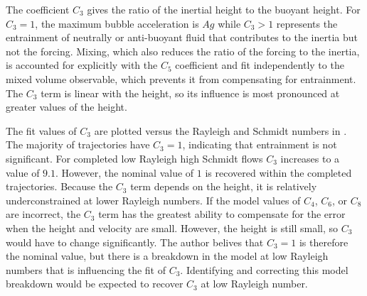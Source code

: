 The coefficient $C_3$ gives the ratio of the inertial height to the buoyant height.
For $C_3 = 1$, the maximum bubble acceleration is $A g$ while $C_3 > 1$ represents the entrainment of neutrally or anti-buoyant fluid that contributes to the inertia but not the forcing.
Mixing, which also reduces the ratio of the forcing to the inertia, is accounted for explicitly with the $C_5$ coefficient and fit independently to the mixed volume observable, which prevents it from compensating for entrainment.
The $C_3$ term is linear with the height, so its influence is most pronounced at greater values of the height.

The fit values of $C_3$ are plotted versus the Rayleigh and Schmidt numbers in .
The majority of trajectories have $C_3 = 1$, indicating that entrainment is not significant.
For completed low Rayleigh high Schmidt flows $C_3$ increases to a value of $9.1$.
However, the nominal value of $1$ is recovered within the completed trajectories.
Because the $C_3$ term depends on the height, it is relatively underconstrained at lower Rayleigh numbers.
If the model values of $C_4$, $C_6$, or $C_8$ are incorrect, the $C_3$ term has the greatest ability to compensate for the error when the height and velocity are small.
However, the height is still small, so $C_3$ would have to change significantly.
The author belives that $C_3 = 1$ is therefore the nominal value, but there is a breakdown in the model at low Rayleigh numbers that is influencing the fit of $C_3$.
Identifying and correcting this model breakdown would be expected to recover $C_3$ at low Rayleigh number.

